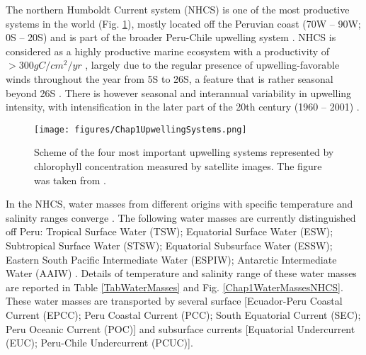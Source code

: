 The northern Humboldt Current system (NHCS) is one of the most productive systems in the world (Fig. \ref{Chap1UpwellingSystems}), mostly located off the Peruvian coast (70\textdegree W – 90\textdegree W; 0\textdegree S – 20\textdegree S) and is part of the broader Peru-Chile upwelling system \citep{GradChai2018}. NHCS is considered as a highly productive marine ecosystem with a productivity of $>300 g C/cm^{2}/yr$ \citep{KampCap5}, largely due to the regular presence of upwelling-favorable winds throughout the year from 5\textdegree S to 26\textdegree S, a feature that is rather seasonal beyond 26\textdegree S \citep{Belm2014}. There is however seasonal and interannual variability in upwelling intensity, with intensification in the later part of the 20th century (1960 – 2001) \citep{Nara2010}.\\

\begin{figure}[ht]
	\texttt{[image: figures/Chap1UpwellingSystems.png]}
	\centering
	\caption{Scheme of the four most important upwelling systems represented by chlorophyll concentration measured by satellite images. The figure was taken from \cite{MessChav2015}.}
	\label{Chap1UpwellingSystems}
\end{figure}

In the NHCS, water masses from different origins with specific temperature and salinity ranges converge \citep{SilvRoja2009,MontCola2010,ChaiDomi2013}. The following water masses are currently distinguished off Peru: Tropical Surface Water (TSW); Equatorial Surface Water (ESW); Subtropical Surface Water (STSW); Equatorial Subsurface Water (ESSW); Eastern South Pacific Intermediate Water (ESPIW); Antarctic Intermediate Water (AAIW) \citep{GradChai2018}. Details of temperature and salinity range of these water masses are reported in Table \ref{TabWaterMasses} and Fig. \ref{Chap1WaterMassesNHCS}. These water masses are transported by several surface [Ecuador-Peru Coastal Current (EPCC); Peru Coastal Current (PCC); South Equatorial Current (SEC); Peru Oceanic Current (POC)] and subsurface currents [Equatorial Undercurrent (EUC); Peru-Chile Undercurrent (PCUC)].\\

